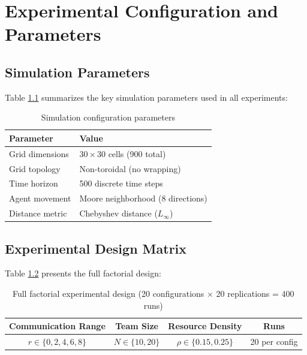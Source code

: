 
\chapter{Experimental Configuration and Parameters}

\section{Simulation Parameters}

Table \ref{tab:sim_params} summarizes the key simulation parameters used in all experiments:

\begin{table}[h]
\centering
\small
\caption{Simulation configuration parameters}
\label{tab:sim_params}
\begin{tabular}{|l|l|}
\hline
\textbf{Parameter} & \textbf{Value} \\
\hline
Grid dimensions & $30 \times 30$ cells (900 total) \\
Grid topology & Non-toroidal (no wrapping) \\
Time horizon & 500 discrete time steps \\
Agent movement & Moore neighborhood (8 directions) \\
Distance metric & Chebyshev distance ($L_\infty$) \\
\hline
\end{tabular}
\end{table}

\section{Experimental Design Matrix}

Table \ref{tab:design_matrix} presents the full factorial design:

\begin{table}[h]
\centering
\small
\caption{Full factorial experimental design (20 configurations × 20 replications = 400 runs)}
\label{tab:design_matrix}
\begin{tabular}{|c|c|c|c|}
\hline
\textbf{Communication Range} & \textbf{Team Size} & \textbf{Resource Density} & \textbf{Runs} \\
\hline
$r \in \{0, 2, 4, 6, 8\}$ & $N \in \{10, 20\}$ & $\rho \in \{0.15, 0.25\}$ & 20 per config \\
\hline
\end{tabular}
\end{table}

